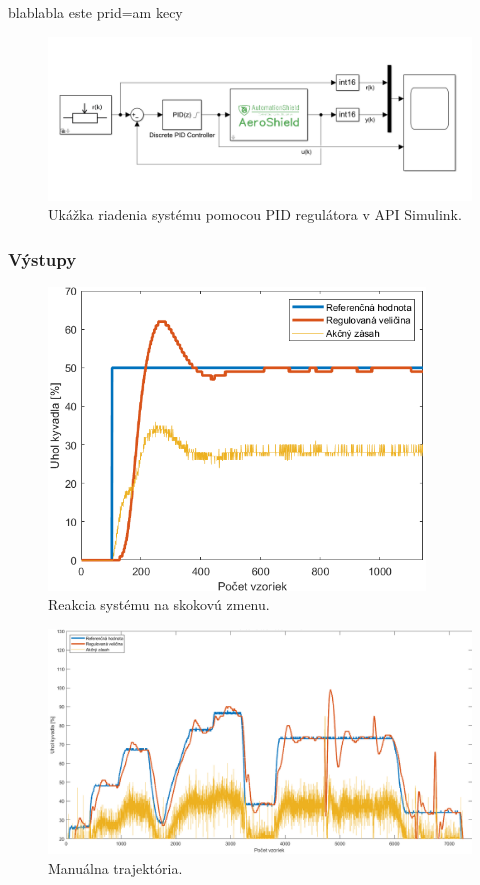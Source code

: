 


blablabla este prid=am kecy





   \begin{figure}[!tbh]
	\centering
	\includegraphics[width=\textwidth]{obr/SimulinkPID.png}
	\caption{Ukážka riadenia systému pomocou PID regulátora v API Simulink.}\label{OBRAZOK 2.6.10}
\end{figure}

\subsubsection{Výstupy}

   \begin{figure}[!tbh]
	\centering
	\includegraphics[width=100mm]{obr/SimSkok.png}
	\caption{Reakcia systému na skokovú zmenu.}\label{OBRAZOK 2.6.11}
\end{figure}

   \begin{figure}[!tbh]
	\centering
	\includegraphics[width=\textwidth]{obr/SimulinkManual.png}
	\caption{Manuálna trajektória.}\label{OBRAZOK 2.6.12}
\end{figure}